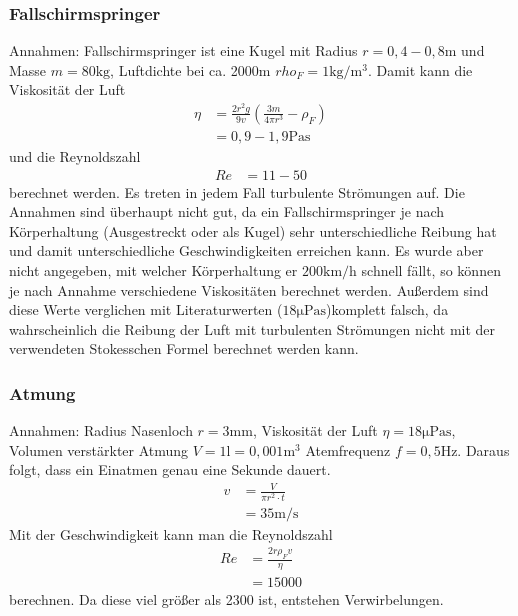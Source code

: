 \documentclass[11pt, a4paper]{article}
\begin{document}
    \subsubsection{Fallschirmspringer}
    Annahmen: Fallschirmspringer ist eine Kugel mit Radius $r = 0,4 - 0,8 \si{\metre}$ und Masse $m = 80 \si{\kilogram}$, Luftdichte bei ca. 2000m $rho_F = 1 \si{\kilogram\per\cubic\metre}$.
    Damit kann die Viskosität der Luft
    \begin{align}
        \eta &= \frac{2 r^2 g}{9 v}(\frac{3m}{4 \pi r^3} - \rho_F) \nonumber \\
        &= 0,9 - 1,9 \si{\pascal\second}
    \end{align}
    und die Reynoldszahl
    \begin{align}
        Re &= 11 - 50
    \end{align}
    berechnet werden. Es treten in jedem Fall turbulente Strömungen auf. Die Annahmen sind überhaupt nicht gut, da ein Fallschirmspringer je nach Körperhaltung (Ausgestreckt oder als Kugel)
    sehr unterschiedliche Reibung hat und damit unterschiedliche Geschwindigkeiten erreichen kann. Es wurde aber nicht angegeben, mit welcher Körperhaltung
    er $200 \si{\kilo\metre\per\hour}$  schnell fällt, so können je nach Annahme verschiedene Viskositäten berechnet werden.
    Außerdem sind diese Werte verglichen mit Literaturwerten ($18 \si{\micro\pascal\second}$)komplett falsch, da wahrscheinlich die Reibung der Luft mit turbulenten Strömungen
    nicht mit der verwendeten Stokesschen Formel \cite[(9)]{VIS} berechnet werden kann.

    \subsubsection{Atmung}
    Annahmen: Radius Nasenloch $r = 3 \si{\milli\metre}$,  Viskosität der Luft $\eta = 18 \si{\micro\pascal\second}$, Volumen verstärkter Atmung $V = 1 \si{\litre} = 0,001 \si{\metre\cubed}$
    Atemfrequenz $f = 0,5 \si{\hertz}$. Daraus folgt, dass ein Einatmen genau eine Sekunde dauert.
    \begin{align}
        v &= \frac{V}{\pi r ^2 \cdot t} \nonumber \\
            &= 35 \si{\metre\per\second}
    \end{align}
    Mit der Geschwindigkeit kann man die Reynoldszahl
    \begin{align}
        Re &= \frac{2r \rho_F v}{\eta} \nonumber \\
        &= 15000
    \end{align}
    berechnen. Da diese viel größer als 2300 ist, entstehen Verwirbelungen.

    
    
\end{document}
